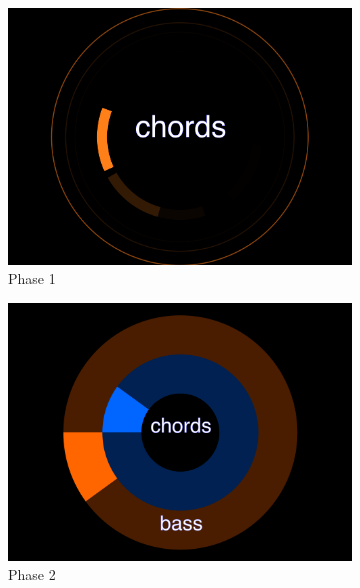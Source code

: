 \begin{figure}
\centering
\begin{subfigure}{.5\textwidth}
  \centering
  \includegraphics[width=.95\linewidth]{../study-2/results/visualisations/didactic-one.png}
  \caption{Phase 1}
  \label{fig:didactic-one}
\end{subfigure}%
\begin{subfigure}{.5\textwidth}
  \centering
  \includegraphics[width=.95\linewidth]{../study-2/results/visualisations/didactic-two.png}
  \caption{Phase 2}
  \label{fig:didactic-two}
\end{subfigure}\\
\begin{subfigure}{.5\textwidth}
  \centering

\end{subfigure}
\end{figure}
